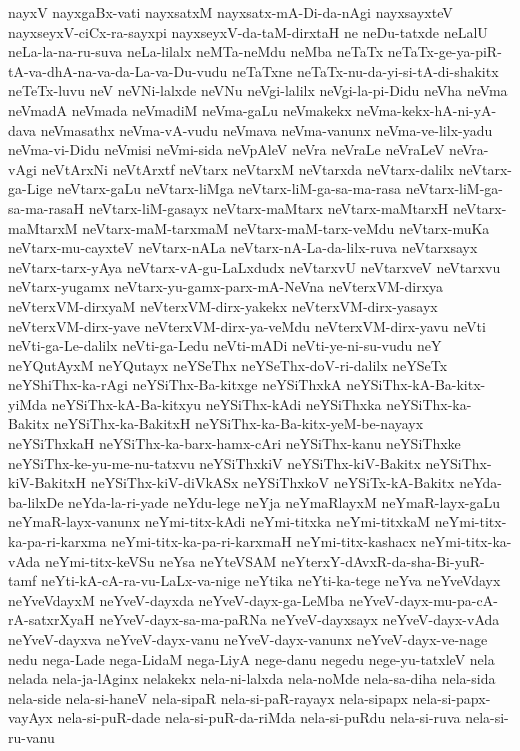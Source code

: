 {nayxV
nayxgaBx-vati
nayxsatxM
nayxsatx-mA-Di-da-nAgi
nayxsayxteV
nayxseyxV-ciCx-ra-sayxpi
nayxseyxV-da-taM-dirxtaH
ne
neDu-tatxde
neLalU
neLa-la-na-ru-suva
neLa-lilalx
neMTa-neMdu
neMba
neTaTx
neTaTx-ge-ya-piR-tA-va-dhA-na-va-da-La-va-Du-vudu
neTaTxne
neTaTx-nu-da-yi-si-tA-di-shakitx
neTeTx-luvu
neV
neVNi-lalxde
neVNu
neVgi-lalilx
neVgi-la-pi-Didu
neVha
neVma
neVmadA
neVmada
neVmadiM
neVma-gaLu
neVmakekx
neVma-kekx-hA-ni-yA-dava
neVmasathx
neVma-vA-vudu
neVmava
neVma-vanunx
neVma-ve-lilx-yadu
neVma-vi-Didu
neVmisi
neVmi-sida
neVpAleV
neVra
neVraLe
neVraLeV
neVra-vAgi
neVtArxNi
neVtArxtf
neVtarx
neVtarxM
neVtarxda
neVtarx-dalilx
neVtarx-ga-Lige
neVtarx-gaLu
neVtarx-liMga
neVtarx-liM-ga-sa-ma-rasa
neVtarx-liM-ga-sa-ma-rasaH
neVtarx-liM-gasayx
neVtarx-maMtarx
neVtarx-maMtarxH
neVtarx-maMtarxM
neVtarx-maM-tarxmaM
neVtarx-maM-tarx-veMdu
neVtarx-muKa
neVtarx-mu-cayxteV
neVtarx-nALa
neVtarx-nA-La-da-lilx-ruva
neVtarxsayx
neVtarx-tarx-yAya
neVtarx-vA-gu-LaLxdudx
neVtarxvU
neVtarxveV
neVtarxvu
neVtarx-yugamx
neVtarx-yu-gamx-parx-mA-NeVna
neVterxVM-dirxya
neVterxVM-dirxyaM
neVterxVM-dirx-yakekx
neVterxVM-dirx-yasayx
neVterxVM-dirx-yave
neVterxVM-dirx-ya-veMdu
neVterxVM-dirx-yavu
neVti
neVti-ga-Le-dalilx
neVti-ga-Ledu
neVti-mADi
neVti-ye-ni-su-vudu
neY
neYQutAyxM
neYQutayx
neYSeThx
neYSeThx-doV-ri-dalilx
neYSeTx
neYShiThx-ka-rAgi
neYSiThx-Ba-kitxge
neYSiThxkA
neYSiThx-kA-Ba-kitx-yiMda
neYSiThx-kA-Ba-kitxyu
neYSiThx-kAdi
neYSiThxka
neYSiThx-ka-Bakitx
neYSiThx-ka-BakitxH
neYSiThx-ka-Ba-kitx-yeM-be-nayayx
neYSiThxkaH
neYSiThx-ka-barx-hamx-cAri
neYSiThx-kanu
neYSiThxke
neYSiThx-ke-yu-me-nu-tatxvu
neYSiThxkiV
neYSiThx-kiV-Bakitx
neYSiThx-kiV-BakitxH
neYSiThx-kiV-diVkASx
neYSiThxkoV
neYSiTx-kA-Bakitx
neYda-ba-lilxDe
neYda-la-ri-yade
neYdu-lege
neYja
neYmaRlayxM
neYmaR-layx-gaLu
neYmaR-layx-vanunx
neYmi-titx-kAdi
neYmi-titxka
neYmi-titxkaM
neYmi-titx-ka-pa-ri-karxma
neYmi-titx-ka-pa-ri-karxmaH
neYmi-titx-kashacx
neYmi-titx-ka-vAda
neYmi-titx-keVSu
neYsa
neYteVSAM
neYterxY-dAvxR-da-sha-Bi-yuR-tamf
neYti-kA-cA-ra-vu-LaLx-va-nige
neYtika
neYti-ka-tege
neYva
neYveVdayx
neYveVdayxM
neYveV-dayxda
neYveV-dayx-ga-LeMba
neYveV-dayx-mu-pa-cA-rA-satxrXyaH
neYveV-dayx-sa-ma-paRNa
neYveV-dayxsayx
neYveV-dayx-vAda
neYveV-dayxva
neYveV-dayx-vanu
neYveV-dayx-vanunx
neYveV-dayx-ve-nage
nedu
nega-Lade
nega-LidaM
nega-LiyA
nege-danu
negedu
nege-yu-tatxleV
nela
nelada
nela-ja-lAginx
nelakekx
nela-ni-lalxda
nela-noMde
nela-sa-diha
nela-sida
nela-side
nela-si-haneV
nela-sipaR
nela-si-paR-rayayx
nela-sipapx
nela-si-papx-vayAyx
nela-si-puR-dade
nela-si-puR-da-riMda
nela-si-puRdu
nela-si-ruva
nela-si-ru-vanu
}
